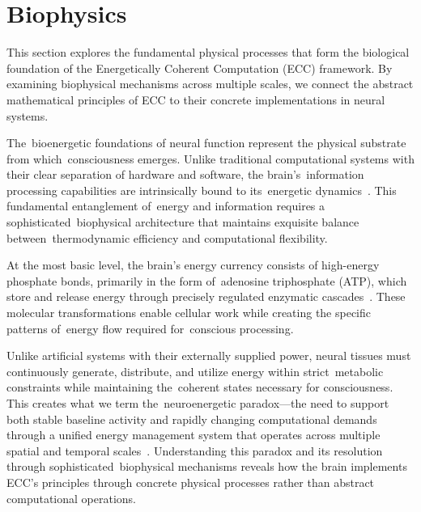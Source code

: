 \section{Biophysics~}

This section explores the fundamental physical processes that form the biological foundation of the Energetically Coherent Computation (ECC) framework. By examining biophysical mechanisms across multiple scales, we connect the abstract mathematical principles of ECC to their concrete implementations in neural systems.

The~bioenergetic foundations of neural function represent the physical substrate from which~consciousness emerges. Unlike traditional computational systems with their clear separation of hardware and software, the brain's~information processing capabilities are intrinsically bound to its~energetic dynamics~\cite{Attwell2001, laughlin2001}. This fundamental entanglement of~energy and information requires a sophisticated~biophysical architecture that maintains exquisite balance between~thermodynamic efficiency and computational flexibility.

At the most basic level, the brain's energy currency consists of high-energy phosphate bonds, primarily in the form of~adenosine triphosphate (ATP), which store and release energy through precisely regulated enzymatic cascades~\cite{Magistretti2015, Sengupta2014}. These molecular transformations enable cellular work while creating the specific patterns of~energy flow required for~conscious processing.

Unlike artificial systems with their externally supplied power, neural tissues must continuously generate, distribute, and utilize energy within strict~metabolic constraints while maintaining the~coherent states necessary for consciousness. This creates what we term the~neuroenergetic paradox—the need to support both stable baseline activity and rapidly changing computational demands through a unified energy management system that operates across multiple spatial and temporal scales~\cite{laughlin2001, Harris2012, DiNuzzo2017}. Understanding this paradox and its resolution through sophisticated~biophysical mechanisms reveals how the brain implements ECC's principles through concrete physical processes rather than abstract computational operations.


